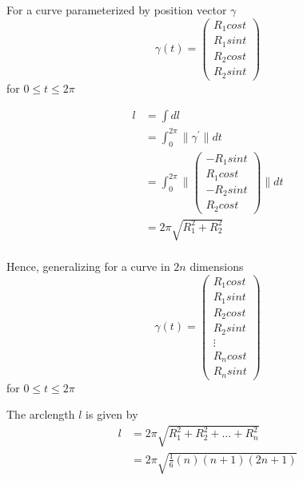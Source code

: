 \begin{framed}
   For a curve parameterized by position vector $\gamma$ 
   \[
     \gamma(t) = \begin{pmatrix}
        R_1 cost \\ R_1 sint \\ R_2 cost  \\ R_2 sint
       
     \end{pmatrix}
   \] for $0 \le t \le 2\pi$

   \begin{align*}
      l &= \int dl \\
        &= \int_0 ^{2\pi} \lVert \gamma ^{\prime} \rVert dt \\
        &= \int_0 ^{2\pi} \lVert \begin{pmatrix} 
        -R_1 sint \\ R_1 cost \\ -R_2 sint  \\ R_2 cost
        \end{pmatrix}
     \rVert dt \\
        &=2 \pi \sqrt{R_1^2 + R_2^2} \\
   \end{align*}

   Hence, generalizing for a curve in $2n$ dimensions
   \[
     \gamma(t) = \begin{pmatrix}
        R_1 cost \\ R_1 sint \\ R_2 cost  \\ R_2 sint \\ \vdots \\ R_n cost \\ R_n sint
     \end{pmatrix}
   \] for $0 \le t \le 2\pi$

   The arclength $l$ is given by 
   \begin{align*}
      l &= 2\pi \sqrt{R_1^2 + R_2^2 + \hdots + R_n^2} \\
        &= 2 \pi \sqrt{ \frac{1}{6} (n) (n+1) (2n+1)}
   \end{align*}
\end{framed}

